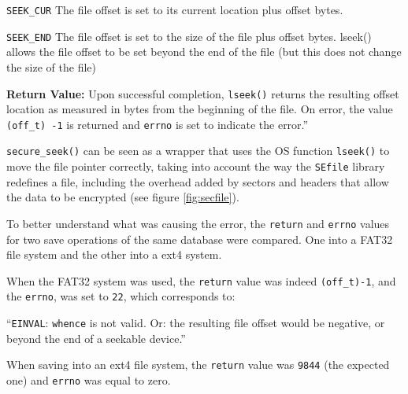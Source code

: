        \texttt{SEEK\_CUR} The file offset is set to its current location plus offset bytes.
       
       \texttt{SEEK\_END} The file offset is set to the size of the file plus offset bytes.
lseek() allows the file offset to be set beyond the end of the file
       (but this does not change the size of the file)
       
\textbf{Return Value:} Upon successful completion, \texttt{lseek()} returns the resulting offset
location as measured in bytes from the beginning of the file.  On error, the value \texttt{(off\_t) -1} is returned and \texttt{errno} is set to indicate the error.''

\vspace{7pt}
\texttt{secure\_seek()} can be seen as a wrapper that uses the OS function \texttt{lseek()} to move the file pointer correctly, taking into account the way the \texttt{SEfile} library redefines a file, including the overhead added by sectors and headers that allow the data to be encrypted (see figure \ref{fig:secfile}).

\vspace{7pt}       
To better understand what was causing the error, the \texttt{return} and \texttt{errno} values for two save operations of the same database were compared. One into a FAT32 file system and the other into a ext4 system.

When the FAT32 system was used, the \texttt{return} value was indeed \texttt{(off\_t)-1}, and the \texttt{errno}, was set to \texttt{22}, which corresponds to:

``\texttt{EINVAL}:  \texttt{whence} is not valid.  Or: the resulting file offset would be negative, or beyond the end of a seekable device.''

When saving into an ext4 file system, the \texttt{return} value was \texttt{9844} (the expected one) and \texttt{errno} was equal to zero.


